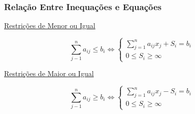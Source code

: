 \documentclass{beamer}
\begin{document}
\begin{frame}
	\frametitle{Relação Entre Inequações e Equações}
	
	{
	\underline{Restrições de Menor ou Igual}
	\begin{mdframed}[backgroundcolor=blue!20]
		\begin{equation*}
			\sum_{j-1}^{n}a_{ij} \le b_i \Leftrightarrow
			\left\{ \begin{matrix}
						\sum_{j=1}^{n}a_{ij}x_j + S_i = b_i \\
						0 \le S_i \ge \infty
					\end{matrix}  
			\right.
		\end{equation*}
	\end{mdframed}	
	}
	
	{
	\vspace{0.5cm}
	\underline{Restrições de Maior ou Igual}
	\begin{mdframed}[backgroundcolor=red!20]
		\begin{equation*}
			\sum_{j-1}^{n}a_{ij} \ge b_i \Leftrightarrow
			\left\{ \begin{matrix}
						\sum_{j=1}^{n}a_{ij}x_j - S_i = b_i \\
						0 \le S_i \ge \infty
					\end{matrix}  
			\right.
		\end{equation*}
	\end{mdframed}
	}
\end{frame}
\end{document}

